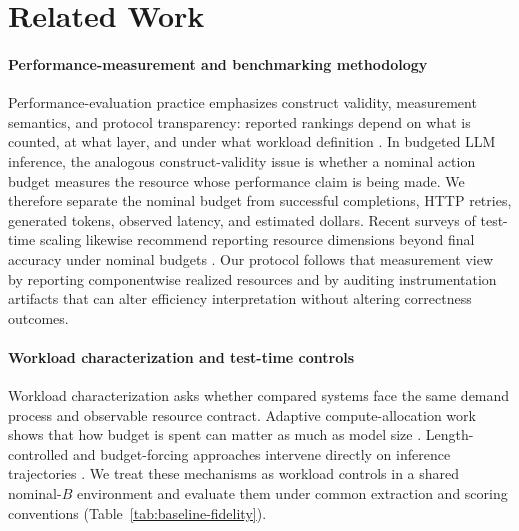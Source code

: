 \section{Related Work}
\label{sec:related}

\paragraph{Performance-measurement and benchmarking methodology}
Performance-evaluation practice emphasizes construct validity, measurement semantics, and protocol
transparency: reported rankings depend on what is counted, at what layer, and under what workload
definition \citep{jain1991,lilja2000,georges2007}. In budgeted LLM inference, the analogous
construct-validity issue is whether a nominal action budget measures the resource whose performance
claim is being made. We therefore separate the nominal budget from successful completions, HTTP
retries, generated tokens, observed latency, and estimated dollars. Recent surveys of
test-time scaling likewise recommend reporting resource dimensions beyond final accuracy under
nominal budgets \citep{ttc_budget_survey,snell_ttc}. Our protocol follows that measurement view by
reporting componentwise realized resources and by auditing instrumentation artifacts that can alter
efficiency interpretation without altering correctness outcomes.

\paragraph{Workload characterization and test-time controls}
Workload characterization asks whether compared systems face the same demand process and observable
resource contract. Adaptive compute-allocation work shows that how budget is spent can matter as
much as model size \citep{snell_ttc,adaptive_ttc_cpo,adactrl,ava}. Length-controlled and
budget-forcing approaches intervene directly on inference trajectories \citep{l1,s1,tale}. We treat
these mechanisms as workload controls in a shared nominal-$B$ environment and evaluate them under
common extraction and scoring conventions (Table~\ref{tab:baseline-fidelity}).

